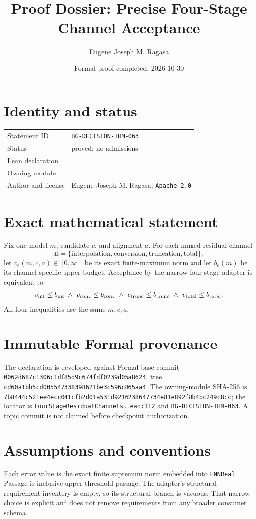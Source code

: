 \documentclass[11pt]{article}
\title{Proof Dossier: Precise Four-Stage Channel Acceptance}
\author{Eugene Joseph M. Ragasa}
\date{Formal proof completed: 2026-10-30}
\begin{document}
\raggedright
\maketitle
\section{Identity and status}
\begin{tabularx}{\textwidth}{@{}lY@{}}
\toprule
Statement ID & \texttt{BG-DECISION-THM-063} \\
Status & proved; no admissions \\
Lean declaration &  \\
Owning module &  \\
Author and license & Eugene Joseph M. Ragasa; \texttt{Apache-2.0} \\
\bottomrule
\end{tabularx}

\section{Exact mathematical statement}
Fix one model $m$, candidate $c$, and alignment $a$. For each named residual channel
\[
E=\{\mathrm{interpolation},\mathrm{conversion},\mathrm{truncation},\mathrm{total}\},
\]
let $v_e(m,c,a)\in[0,\infty]$ be its exact finite-maximum norm and let $b_e(m)$ be its channel-specific upper budget. Acceptance by the narrow four-stage adapter is equivalent to
\[
 v_{\rm int}\le b_{\rm int}\ \land\
 v_{\rm conv}\le b_{\rm conv}\ \land\
 v_{\rm trunc}\le b_{\rm trunc}\ \land\
 v_{\rm total}\le b_{\rm total}.
\]
All four inequalities use the same $m,c,a$.

\section{Immutable Formal provenance}
The declaration is developed against Formal base commit
\texttt{0062d687c1306c1df85d9c674fdf0239d05a8624}, tree
\texttt{cd60a1bb5cd005547338398621be3c596c865aa4}. The owning-module SHA-256 is
\texttt{7b8444c521ee4ecc041cfb2d01a531d9216238647734e81e892f8b4bc249c8cc}; the locator is
\texttt{FourStageResidualChannels.lean:112} and \texttt{BG-DECISION-THM-063}. A topic commit is not claimed before checkpoint authorization.

\section{Assumptions and conventions}
Each error value is the exact finite supremum norm embedded into \texttt{ENNReal}. Passage is inclusive upper-threshold passage. The adapter's structural-requirement inventory is empty, so its structural branch is vacuous. That narrow choice is explicit and does not remove requirements from any broader consumer schema.
\end{document}
